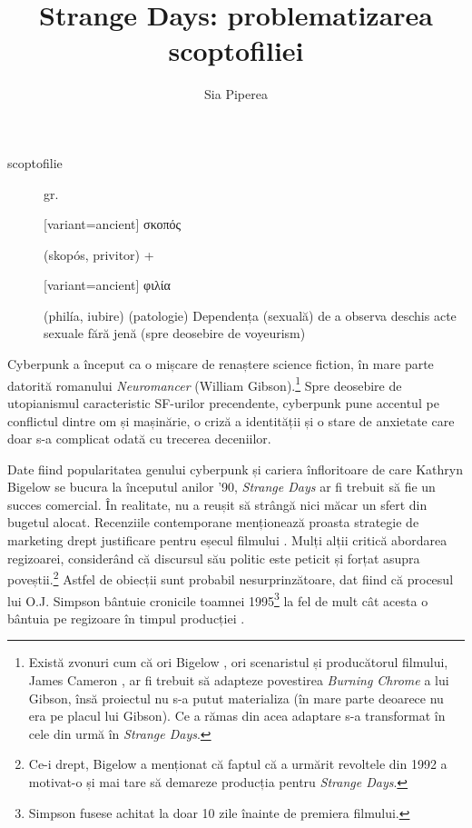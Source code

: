 \documentclass[12pt]{article}
\title{Strange Days: problematizarea scoptofiliei}
\author{Sia Piperea}
\begin{document}
	 	
	\maketitle
	
	\begin{description}
		\item[scoptofilie] gr. \begin{greek}[variant=ancient] σκοπός \end{greek} (skopós, \dedouble privitor\sqtworight) +‎ \begin{greek}[variant=ancient] φιλία \end{greek} (philía, \dedouble iubire\sqtworight)\break
		 (patologie) Dependența (sexuală) de a observa deschis acte sexuale fără jenă (spre deosebire de voyeurism)
	\end{description}
			 	
	Cyberpunk a început ca o mișcare de renaștere science fiction, în mare parte datorită romanului \textit{Neuromancer} (William Gibson).\footnote{Există zvonuri cum că ori Bigelow \cite{Salza1994a}, ori scenaristul și producătorul filmului, James Cameron \cite{Henry2023a}, ar fi trebuit să adapteze povestirea \textit{Burning Chrome} a lui Gibson, însă proiectul nu s-a putut materializa (în mare parte deoarece nu era pe placul lui Gibson). Ce a rămas din acea adaptare s-a transformat în cele din urmă în \textit{Strange Days}.} Spre deosebire de utopianismul caracteristic SF-urilor precendente, cyberpunk pune accentul pe conflictul dintre om și mașinărie, o criză a identității și o stare de anxietate care doar s-a complicat odată cu trecerea deceniilor.\par
	
	Date fiind popularitatea genului cyberpunk și cariera înfloritoare de care Kathryn Bigelow se bucura la începutul anilor '90, \textit{Strange Days} ar fi trebuit să fie un succes comercial. În realitate, nu a reușit să strângă nici măcar un sfert din bugetul alocat. Recenziile contemporane menționează proasta strategie de marketing drept justificare pentru eșecul filmului \cite{McCarthy1995a}. Mulți alții critică abordarea regizoarei, considerând că discursul său politic este peticit și forțat asupra poveștii.\footnote{Ce-i drept, Bigelow a menționat că faptul că a urmărit revoltele din 1992 a motivat-o și mai tare să demareze producția pentru \textit{Strange Days}.} Astfel de obiecții sunt probabil nesurprinzătoare, dat fiind că procesul lui O.J. Simpson bântuie cronicile toamnei 1995\footnote{Simpson fusese achitat la doar 10 zile înainte de premiera filmului.} la fel de mult cât acesta o bântuia pe regizoare în timpul producției \cite{Willistein1995a}.\par
	
\end{document}
